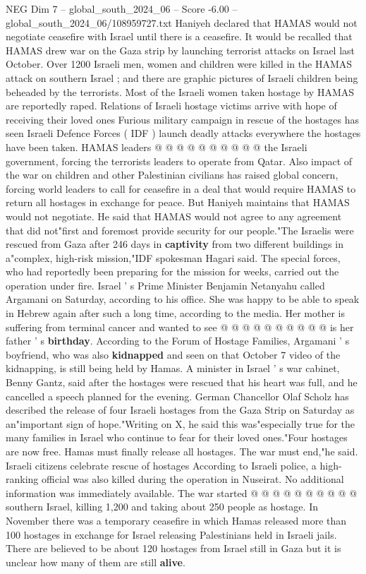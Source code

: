 \begin{textsample}{NEG Dim 7 – global\_south\_2024\_06 – Score -6.00 – global\_south\_2024\_06/108959727.txt}
Haniyeh declared that HAMAS would not negotiate ceasefire with Israel until there is a ceasefire.
It would be recalled that HAMAS drew war on the Gaza strip by launching terrorist attacks on Israel last October.
Over 1200 Israeli men, women and children were killed in the HAMAS attack on southern Israel ; and there are graphic pictures of Israeli children being beheaded by the terrorists.
Most of the Israeli women taken hostage by HAMAS are reportedly raped.
Relations of Israeli hostage victims arrive with hope of receiving their loved ones Furious military campaign in rescue of the hostages has seen Israeli Defence Forces ( IDF ) launch deadly attacks everywhere the hostages have been taken.
HAMAS leaders @ @ @ @ @ @ @ @ @ @ the Israeli government, forcing the terrorists leaders to operate from Qatar.
Also impact of the war on children and other Palestinian civilians has raised global concern, forcing world leaders to call for ceasefire in a deal that would require HAMAS to return all hostages in exchange for peace.
But Haniyeh maintains that HAMAS would not negotiate.
He said that HAMAS would not agree to any agreement that did not"first and foremost provide security for our people."The Israelis were rescued from Gaza after 246 days in \textbf{captivity} from two different buildings in a"complex, high-risk mission,"IDF spokesman Hagari said.
The special forces, who had reportedly been preparing for the mission for weeks, carried out the operation under fire.
Israel ' s Prime Minister Benjamin Netanyahu called Argamani on Saturday, according to his office.
She was happy to be able to speak in Hebrew again after such a long time, according to the media.
Her mother is suffering from terminal cancer and wanted to see @ @ @ @ @ @ @ @ @ @ is her father ' s \textbf{birthday}.
According to the Forum of Hostage Families, Argamani ' s boyfriend, who was also \textbf{kidnapped} and seen on that October 7 video of the kidnapping, is still being held by Hamas.
A minister in Israel ' s war cabinet, Benny Gantz, said after the hostages were rescued that his heart was full, and he cancelled a speech planned for the evening.
German Chancellor Olaf Scholz has described the release of four Israeli hostages from the Gaza Strip on Saturday as an"important sign of hope."Writing on X, he said this was"especially true for the many families in Israel who continue to fear for their loved ones."Four hostages are now free.
Hamas must finally release all hostages.
The war must end,"he said.
Israeli citizens celebrate rescue of hostages According to Israeli police, a high-ranking official was also killed during the operation in Nuseirat.
No additional information was immediately available.
The war started @ @ @ @ @ @ @ @ @ @ southern Israel, killing 1,200 and taking about 250 people as hostage.
In November there was a temporary ceasefire in which Hamas released more than 100 hostages in exchange for Israel releasing Palestinians held in Israeli jails.
There are believed to be about 120 hostages from Israel still in Gaza but it is unclear how many of them are still \textbf{alive}.

\end{textsample}

